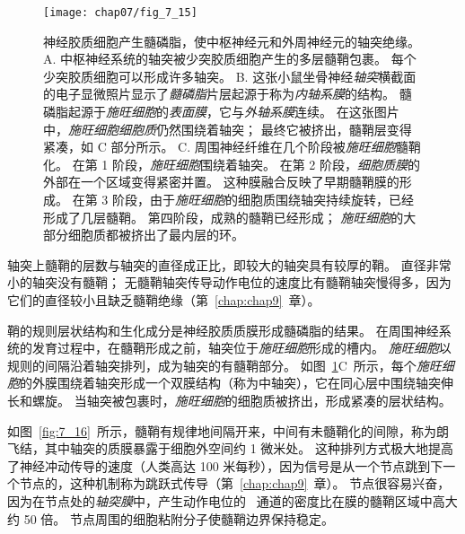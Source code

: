 \begin{figure}[htbp]
	\centering
	\texttt{[image: chap07/fig\_7\_15]}
	\caption{神经胶质细胞产生髓磷脂，使中枢神经元和外周神经元的轴突绝缘。
		A. 中枢神经系统的轴突被少突胶质细胞产生的多层髓鞘包裹。
		每个少突胶质细胞可以形成许多轴突\cite{raine1984morphology}。
		B. 这张小鼠坐骨神经\textit{轴突}横截面的电子显微照片显示了\textit{髓磷脂}片层起源于称为\textit{内轴系膜}的结构。
		髓磷脂起源于\textit{施旺细胞}的\textit{表面膜}，它与\textit{外轴系膜}连续。
		在这张图片中，\textit{施旺细胞细胞质}仍然围绕着轴突；
		最终它被挤出，髓鞘层变得紧凑，如 C 部分所示\cite{thomas1984clinical}。
		C. 周围神经纤维在几个阶段被\textit{施旺细胞}髓鞘化。
		在第 1 阶段，\textit{施旺细胞}围绕着轴突。
		在第 2 阶段，\textit{细胞质膜}的外部在一个区域变得紧密并置。
		这种膜融合反映了早期髓鞘膜的形成。
		在第 3 阶段，由于\textit{施旺细胞}的细胞质围绕轴突持续旋转，已经形成了几层髓鞘。
		第四阶段，成熟的髓鞘已经形成；
		\textit{施旺细胞}的大部分细胞质都被挤出了最内层的环\cite{williams1989bannister}。}
	\label{fig:7_15}
\end{figure}


轴突上髓鞘的层数与轴突的直径成正比，即较大的轴突具有较厚的鞘。
直径非常小的轴突没有髓鞘；
无髓鞘轴突传导动作电位的速度比有髓鞘轴突慢得多，因为它们的直径较小且缺乏髓鞘绝缘（第~\ref{chap:chap9}~章）。


鞘的规则层状结构和生化成分是神经胶质质膜形成髓磷脂的结果。
在周围神经系统的发育过程中，在髓鞘形成之前，轴突位于\textit{施旺细胞}形成的槽内。
\textit{施旺细胞}以规则的间隔沿着轴突排列，成为轴突的有髓鞘部分。
如图~\ref{fig:7_15}C~所示，每个\textit{施旺细胞}的外膜围绕着轴突形成一个双膜结构（称为中轴突），它在同心层中围绕轴突伸长和螺旋。
当轴突被包裹时，\textit{施旺细胞}的细胞质被挤出，形成紧凑的层状结构。


如图~\ref{fig:7_16}~所示，髓鞘有规律地间隔开来，中间有未髓鞘化的间隙，称为朗飞结，其中轴突的质膜暴露于细胞外空间约 1 微米处。 
这种排列方式极大地提高了神经冲动传导的速度（人类高达 100 米每秒），因为信号是从一个节点跳到下一个节点的，这种机制称为跳跃式传导（第~\ref{chap:chap9}~章）。 
节点很容易兴奋，因为在节点处的\textit{轴突膜}中，产生动作电位的~ 通道的密度比在膜的髓鞘区域中高大约 50 倍。
节点周围的细胞粘附分子使髓鞘边界保持稳定。


